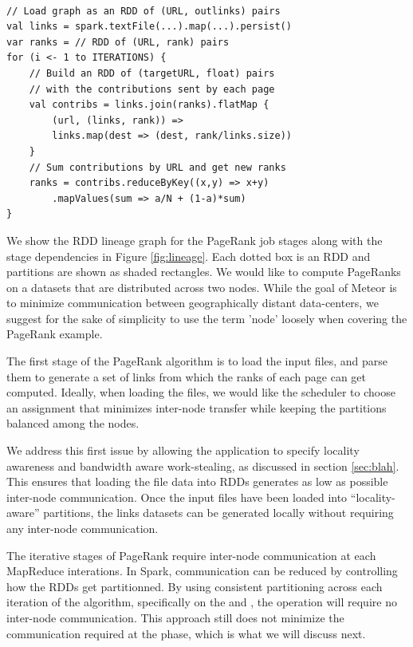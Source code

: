 %
\begin{lstlisting}[label=mapreduce] 

// Load graph as an RDD of (URL, outlinks) pairs
val links = spark.textFile(...).map(...).persist()
var ranks = // RDD of (URL, rank) pairs
for (i <- 1 to ITERATIONS) {
    // Build an RDD of (targetURL, float) pairs
    // with the contributions sent by each page
    val contribs = links.join(ranks).flatMap {
        (url, (links, rank)) =>
        links.map(dest => (dest, rank/links.size))
    }
    // Sum contributions by URL and get new ranks
    ranks = contribs.reduceByKey((x,y) => x+y)
        .mapValues(sum => a/N + (1-a)*sum)
}

\end{lstlisting}
%

We show the RDD lineage graph for the PageRank job stages along with the stage dependencies in Figure \ref{fig:lineage}. Each dotted box is an RDD and partitions are shown as shaded rectangles. We would like to compute PageRanks on a datasets that are distributed across two nodes. While the goal of Meteor is to minimize communication between geographically distant data-centers, we suggest for the sake of simplicity to use the term 'node' loosely when covering the PageRank example.

The first stage of the PageRank algorithm is to load the input files, and parse them to generate a set of links from which the ranks of each page can get computed. Ideally, when loading the files, we would like the scheduler to choose an assignment that minimizes inter-node transfer while keeping the partitions balanced among the nodes. 

We address this first issue by allowing the application to specify locality awareness and bandwidth aware work-stealing, as discussed in section \ref{sec:blah}. This ensures that loading the file data into RDDs generates as low as possible inter-node communication. Once the input files have been loaded into ``locality-aware'' partitions, the links datasets can be generated locally without requiring any inter-node communication. 

The iterative stages of PageRank require inter-node communication at each MapReduce interations. In Spark, communication can be reduced by controlling how the RDDs get partitionned. By using consistent partitioning across each iteration of the algorithm, specifically on the  and , the  operation will require no inter-node communication. This approach still does not minimize the communication required at the  phase, which is what we will discuss next.

